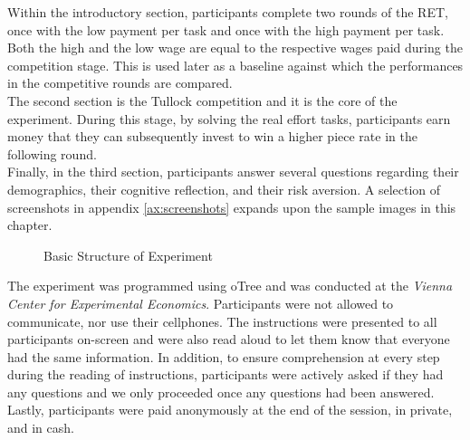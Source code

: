     Within the introductory section, participants complete two rounds of the RET, once with the low payment per task and once with the high payment per task. Both the high and the low wage are equal to the respective wages paid during the competition stage. This is used later as a baseline against which the performances in the competitive rounds are compared.\\
    
    The second section is the Tullock competition and it is the core of the experiment. During this stage, by solving the real effort tasks, participants earn money that they can subsequently invest to win a higher piece rate in the following round.\\
    
    Finally, in the third section, participants answer several questions regarding their demographics, their cognitive reflection, and their risk aversion. A selection of screenshots in appendix \ref{ax:screenshots} expands upon the sample images in this chapter.\\
    
    \begin{figure}
\centering
{}

\caption{Basic Structure of Experiment}
\label{fig:exp_str}
\end{figure}
    
    The experiment was programmed using oTree \citep{chen2016}
    and was conducted at the \textit{Vienna Center for Experimental Economics}. Participants were not allowed to communicate, nor use their cellphones. The instructions were presented to all participants on-screen and were also read aloud to let them know that everyone had the same information. In addition, to ensure comprehension at every step during the reading of instructions, participants were actively asked if they had any questions and we only proceeded once any questions had been answered. Lastly, participants were paid anonymously at the end of the session, in private, and in cash.
    
